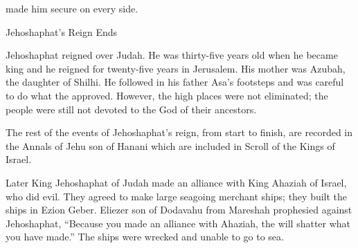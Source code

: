 {made him secure on every side.
\par }{\SH Jehoshaphat’s Reign Ends
\par }{\PP {}Jehoshaphat
reigned
over
Judah.
He was thirty-five
years
old
when he became king
and he reigned
for twenty-five
years
in Jerusalem.
His mother
was Azubah,
the daughter
of Shilhi.
He followed
in his father
Asa’s
footsteps
and was careful
to do what
the {}
approved.
However,
the high places
were not
eliminated;
the people
were still
not
devoted
to the God
of their ancestors.
\par }{\PP {}The rest
of the events
of Jehoshaphat’s
reign, from start
to finish,
are recorded
in the Annals
of Jehu
son
of Hanani
which
are included
in Scroll
of the Kings
of Israel.
\par }{\PP {}Later
King
Jehoshaphat
of Judah
made an alliance
with
King
Ahaziah
of Israel,
who did
evil.
They agreed
to make
large seagoing merchant ships;
they built
the ships
in Ezion Geber.
Eliezer
son
of Dodavahu
from Mareshah
prophesied
against
Jehoshaphat,
“Because you made an alliance
with
Ahaziah,
the {}
will shatter
what
you have made.” The ships
were wrecked
and unable
to go
to
sea.

}
